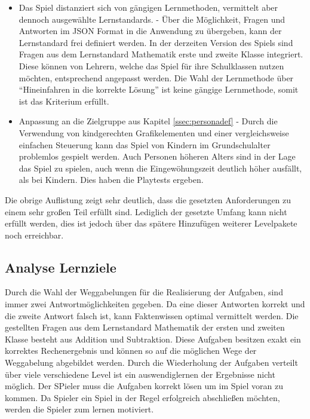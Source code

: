 \begin{itemize}
    \item{Das Spiel distanziert sich von gängigen Lernmethoden, vermittelt aber dennoch ausgewählte Lernstandards. - Über die Möglichkeit, Fragen und Antworten im JSON Format in die Anwendung zu übergeben, kann der Lernstandard frei definiert werden. In der derzeiten Version des Spiels sind Fragen aus dem Lernstandard Mathematik erste und zweite Klasse integriert. Diese können von Lehrern, welche das Spiel für ihre Schulklassen nutzen möchten, entsprechend angepasst werden. Die Wahl der Lernmethode über \enquote{Hineinfahren in die korrekte Lösung} ist keine gängige Lernmethode, somit ist das Kriterium erfüllt.}
    \item{Anpassung an die Zielgruppe aus Kapitel \ref{ssec:personadef} - Durch die Verwendung von kindgerechten Grafikelementen und einer vergleichsweise einfachen Steuerung kann das Spiel von Kindern im Grundschulalter problemlos gespielt werden. Auch Personen höheren Alters sind in der Lage das Spiel zu spielen, auch wenn die Eingewöhungszeit deutlich höher ausfällt, als bei Kindern. Dies haben die Playtests ergeben.}
\end{itemize}
Die obrige Auflistung zeigt sehr deutlich, dass die gesetzten Anforderungen zu einem sehr großen Teil erfüllt sind. Lediglich der gesetzte Umfang kann nicht erfüllt werden, dies ist jedoch über das spätere Hinzufügen weiterer Levelpakete noch erreichbar.

\subsection{Analyse Lernziele}
Durch die Wahl der Weggabelungen für die Realisierung der Aufgaben, sind immer zwei Antwortmöglichkeiten gegeben. Da eine dieser Antworten korrekt und die zweite Antwort falsch ist, kann Faktenwissen optimal vermittelt werden. Die gestellten Fragen aus dem Lernstandard Mathematik der ersten und zweiten Klasse besteht aus Addition und Subtraktion. Diese Aufgaben besitzen exakt ein korrektes Rechenergebnis und können so auf die möglichen Wege der Weggabelung abgebildet werden. Durch die Wiederholung der Aufgaben verteilt über viele verschiedene Level ist ein auswendiglernen der Ergebnisse nicht möglich. Der SPieler muss die Aufgaben korrekt lösen um im Spiel voran zu kommen. Da Spieler ein Spiel in der Regel erfolgreich abschließen möchten, werden die Spieler zum lernen motiviert.

